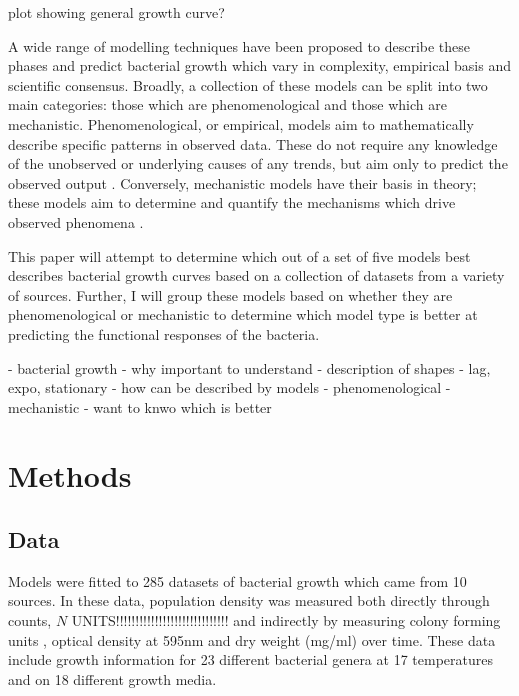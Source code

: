 \documentclass[11pt]{article}
\begin{document}
\begin{linenumbers}
        plot showing general growth curve?
        
        A wide range of modelling techniques have been proposed to describe these phases and predict bacterial growth which vary in complexity, empirical basis and scientific consensus. Broadly, a collection of these models can be split into two main categories: those which are phenomenological and those which are mechanistic. Phenomenological, or empirical, models aim to mathematically describe specific patterns in observed data. These do not require any knowledge of the unobserved or underlying causes of any trends, but aim only to predict the observed output \citep{vlazaki_integrating_2019}. Conversely, mechanistic models have their basis in theory; these models aim to determine and quantify the mechanisms which drive observed phenomena \citep{ferrer_mathematical_2009}. 
        
        This paper will attempt to determine which out of a set of five models best describes bacterial growth curves based on a collection of datasets from a variety of sources. Further, I will group these models based on whether they are phenomenological or mechanistic to determine which model type is better at predicting the functional responses of the bacteria.
        
        








        
    
        - bacterial growth - why important to understand
        - description of shapes - lag, expo, stationary
        - how can be described by models
        - phenomenological
        - mechanistic
        - want to knwo which is better



    \section{Methods}

        \subsection{Data}

            Models were fitted to 285 datasets of bacterial growth which came from 10 sources. In these data, population density was measured both directly through counts, $N$ UNITS!!!!!!!!!!!!!!!!!!!!!!!!!!!!! \citep{phillips_relation_1987, gill_growth_1991, zwietering_modeling_1994, bernhardt_metabolic_2018,  silva_modelling_2018} and indirectly by measuring colony forming units \citep{stannard_temperaturegrowth_1985, roth_continuity_1962, galarz_predicting_2016}, optical density at 595nm \citep{bae_growth_2014} and dry weight (mg/ml) \citep{sivonen_effects_1990} over time. These data include growth information for 23 different bacterial genera at 17 temperatures and on 18 different growth media. 
            

\end{linenumbers}
\end{document}
